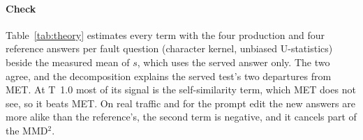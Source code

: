 \documentclass[11pt]{article}
\begin{document}
\paragraph{Check} Table~\ref{tab:theory} estimates every term with the four
production and four reference answers per fault question (character kernel,
unbiased U-statistics) beside the measured mean of $s$, which uses the served
answer only. The two agree, and the decomposition explains the served test's two
departures from MET. At T~1.0 most of its signal is the self-similarity term,
which MET does not see, so it beats MET. On real traffic and for the prompt edit
the new answers are more alike than the reference's, the second term is negative,
and it cancels part of the MMD$^2$.

\begin{table}[h]
  \centering\small
  \caption{The decomposition, averaged over fault questions ($\times10^{-3}$,
  character kernel). Measured: mean of $s$ from the served answer alone.
  Predicted: $\tfrac12\mathrm{MMD}^2+\tfrac12(K_{rr}-K_{cc})$ from four answers per side.}
  \label{tab:theory}
  \setlength{\tabcolsep}{3.2pt}
\end{table}
\end{document}
